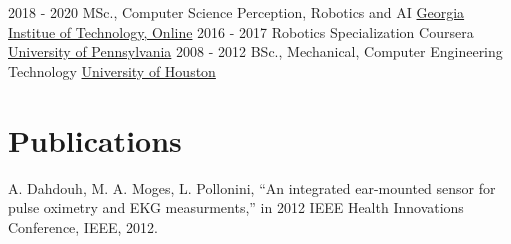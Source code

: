 \documentclass[letterpaper]{twentysecondcv} %
\begin{document}
\begin{twenty} %
	\twentyitem
    	{2018 - 2020}
        {}
        {MSc., Computer Science \textnormal{Perception, Robotics and AI}}
        {\href{http://www.omscs.gatech.edu/}{Georgia Institue of Technology, Online}}
        {}
        {}
    \twentyitem
    {2016 - 2017}
    {}
    {Robotics Specialization \textnormal{Coursera}}
    {\href{https://www.coursera.org/specializations/robotics}{University of Pennsylvania}}
    {}
    {}
	\twentyitem
    	{2008 - 2012}
		{}
        {BSc., Mechanical, Computer Engineering Technology}
        {\href{http://www.uh.edu/}{University of Houston}}
        {}
        {}
\end{twenty}

\section{Publications}
A. Dahdouh, M. A. Moges, L. Pollonini, “An integrated ear-mounted sensor for pulse oximetry and EKG measurments,” in 2012 IEEE Health Innovations Conference, IEEE, 2012. 
\end{document}
